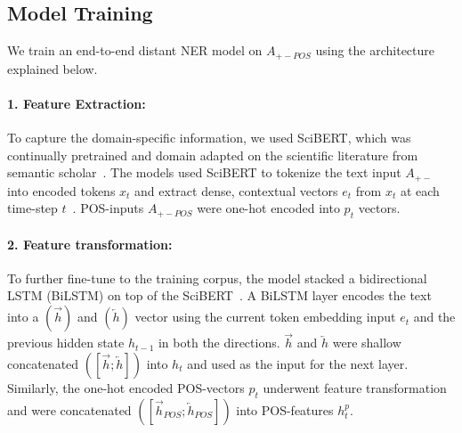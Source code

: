 \documentclass[11pt]{article}
\begin{document}
\subsection{Model Training}
\label{subsec:training}
%
We train an end-to-end distant NER model on $A_{+-POS}$ using the architecture explained below.
%
\paragraph{1. Feature Extraction:}
%
To capture the domain-specific information, we used SciBERT, which was continually pretrained and domain adapted on the scientific literature from semantic scholar~\cite{gururangan2020don}.
The models used SciBERT to tokenize the text input $A_{+-}$ into encoded tokens $x_{t}$ and extract dense, contextual vectors $e_{t}$ from $x_{t}$ at each time-step $t$~\cite{beltagy2019scibert}.
POS-inputs $A_{+-POS}$ were one-hot encoded into $p_{t}$ vectors.
%
\paragraph{2. Feature transformation:}
%
To further fine-tune to the training corpus, the model stacked a bidirectional LSTM (BiLSTM) on top of the SciBERT~\cite{hochreiter1997long}.
A BiLSTM layer encodes the text into a $(\overrightarrow{h})$ and $(\overleftarrow{h})$  vector using the current token embedding input $e_{t}$ and the previous hidden state $h_{t-1}$ in both the directions.
$\overrightarrow{h}$ and $\overleftarrow{h}$ were shallow concatenated $([\overrightarrow{h}; \overleftarrow{h}])$ into $h_{t}$ and used as the input for the next layer.
Similarly, the one-hot encoded POS-vectors $p_{t}$ underwent feature transformation and were concatenated $([\overrightarrow{h}_{POS}; \overleftarrow{h}_{POS}])$ into POS-features $h^{p}_{t}$.
%
\end{document}
